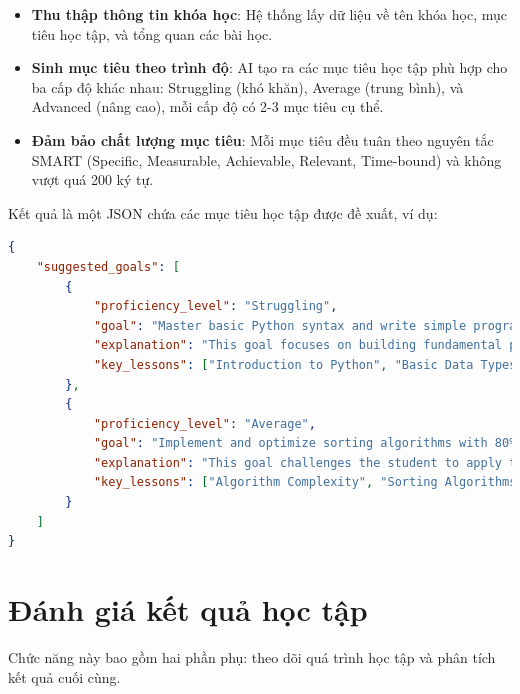 \begin{itemize}
    \item \textbf{Thu thập thông tin khóa học}: Hệ thống lấy dữ liệu về tên khóa học, mục tiêu học tập, và tổng quan các bài học.
    \item \textbf{Sinh mục tiêu theo trình độ}: AI tạo ra các mục tiêu học tập phù hợp cho ba cấp độ khác nhau: Struggling (khó khăn), Average (trung bình), và Advanced (nâng cao), mỗi cấp độ có 2-3 mục tiêu cụ thể.
    \item \textbf{Đảm bảo chất lượng mục tiêu}: Mỗi mục tiêu đều tuân theo nguyên tắc SMART (Specific, Measurable, Achievable, Relevant, Time-bound) và không vượt quá 200 ký tự.
\end{itemize}

Kết quả là một JSON chứa các mục tiêu học tập được đề xuất, ví dụ:
\begin{lstlisting}[language=JSON]
{
    "suggested_goals": [
        {
            "proficiency_level": "Struggling",
            "goal": "Master basic Python syntax and write simple programs with 70% accuracy by midterm",
            "explanation": "This goal focuses on building fundamental programming skills...",
            "key_lessons": ["Introduction to Python", "Basic Data Types"]
        },
        {
            "proficiency_level": "Average",
            "goal": "Implement and optimize sorting algorithms with 80% efficiency by midterm",
            "explanation": "This goal challenges the student to apply theoretical concepts...",
            "key_lessons": ["Algorithm Complexity", "Sorting Algorithms"]
        }
    ]
}
\end{lstlisting}

\section{Đánh giá kết quả học tập}
Chức năng này bao gồm hai phần phụ: theo dõi quá trình học tập và phân tích kết quả cuối cùng.


